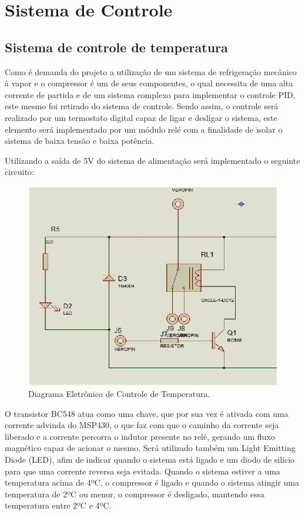 \section{Sistema de Controle}

\subsection{Sistema de controle de temperatura}

Como é demanda do projeto a utilização de um sistema de refrigeração mecânico à vapor e o compressor é um de seus componentes, o qual necessita de uma alta corrente de partida e de um sistema complexo para implementar o controle PID, este mesmo foi retirado do sistema de controle. Sendo assim, o controle será realizado por um termostato digital capaz de ligar e desligar o sistema, este elemento será implementado por um módulo relé com a finalidade de isolar o sistema de baixa tensão e baixa potência.

Utilizando a saída de 5V do sistema de alimentação será implementado o seguinte circuito:

\begin{figure}[H]
\centering
\includegraphics[width=16cm]{figuras/controletemperatura_eletronica.jpg}
\caption{Diagrama Eletrônico de Controle de Temperatura.}
\end{figure}

O transistor BC548 atua como uma chave, que por sua vez é ativada com uma corrente advinda do MSP430, o que faz com que o caminho da corrente seja liberado e a corrente percorra o indutor presente no relé, gerando um fluxo magnético capaz de acionar o mesmo. Será utilizado também um Light Emitting Diode (LED), afim de indicar quando o sistema está ligado e um diodo de silício para que uma corrente reversa seja evitada. 
Quando o sistema estiver a uma temperatura acima de 4ºC, o compressor é ligado e quando o sistema atingir uma temperatura de 2ºC ou menor, o compressor é desligado, mantendo essa temperatura entre 2ºC e 4ºC.

